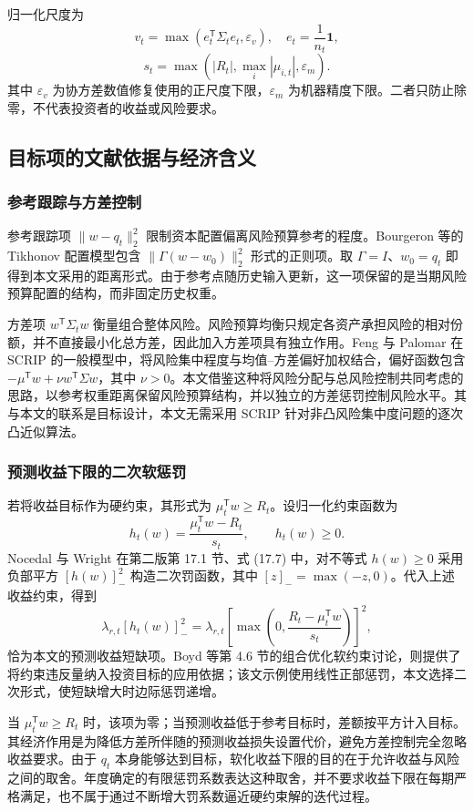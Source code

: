 归一化尺度为
\[
v_t=\max(e_t^\mathsf T\Sigma_t e_t,\varepsilon_v),\quad
e_t=\frac1{n_t}\mathbf1,
\]
\[
s_t=\max(|R_t|,\max_i|\mu_{i,t}|,\varepsilon_m).
\]
其中 $\varepsilon_v$ 为协方差数值修复使用的正尺度下限，$\varepsilon_m$ 为机器精度下限。二者只防止除零，不代表投资者的收益或风险要求。

\subsection{目标项的文献依据与经济含义}
\subsubsection{参考跟踪与方差控制}
参考跟踪项 $\|w-q_t\|_2^2$ 限制资本配置偏离风险预算参考的程度。Bourgeron 等的 Tikhonov 配置模型包含 $\|\Gamma(w-w_0)\|_2^2$ 形式的正则项\cite{bourgeron2018robust}。取 $\Gamma=I$、$w_0=q_t$ 即得到本文采用的距离形式。由于参考点随历史输入更新，这一项保留的是当期风险预算配置的结构，而非固定历史权重。

方差项 $w^\mathsf T\Sigma_t w$ 衡量组合整体风险。风险预算均衡只规定各资产承担风险的相对份额，并不直接最小化总方差，因此加入方差项具有独立作用。Feng 与 Palomar 在 SCRIP 的一般模型中，将风险集中程度与均值--方差偏好加权结合，偏好函数包含 $-\mu^\mathsf T w+\nu w^\mathsf T\Sigma w$，其中 $\nu>0$\cite{feng2015scrip}。本文借鉴这种将风险分配与总风险控制共同考虑的思路，以参考权重距离保留风险预算结构，并以独立的方差惩罚控制风险水平。其与本文的联系是目标设计，本文无需采用 SCRIP 针对非凸风险集中度问题的逐次凸近似算法。

\subsubsection{预测收益下限的二次软惩罚}
若将收益目标作为硬约束，其形式为 $\mu_t^\mathsf T w\geq R_t$。设归一化约束函数为
\[
h_t(w)=\frac{\mu_t^\mathsf T w-R_t}{s_t},\qquad h_t(w)\geq0.
\]
Nocedal 与 Wright 在第二版第 17.1 节、式 (17.7) 中，对不等式 $h(w)\geq0$ 采用负部平方 $[h(w)]_-^2$ 构造二次罚函数，其中 $[z]_- =\max(-z,0)$\cite{nocedal2006numerical}。代入上述收益约束，得到
\[
\lambda_{r,t}[h_t(w)]_-^2
=\lambda_{r,t}\left[\max\left(0,\frac{R_t-\mu_t^\mathsf T w}{s_t}\right)\right]^2,
\]
恰为本文的预测收益短缺项。Boyd 等第 4.6 节的组合优化软约束讨论，则提供了将约束违反量纳入投资目标的应用依据\cite{boyd2017multiperiod}；该文示例使用线性正部惩罚，本文选择二次形式，使短缺增大时边际惩罚递增。

当 $\mu_t^\mathsf T w\geq R_t$ 时，该项为零；当预测收益低于参考目标时，差额按平方计入目标。其经济作用是为降低方差所伴随的预测收益损失设置代价，避免方差控制完全忽略收益要求。由于 $q_t$ 本身能够达到目标，软化收益下限的目的在于允许收益与风险之间的取舍。年度确定的有限惩罚系数表达这种取舍，并不要求收益下限在每期严格满足，也不属于通过不断增大罚系数逼近硬约束解的迭代过程。

